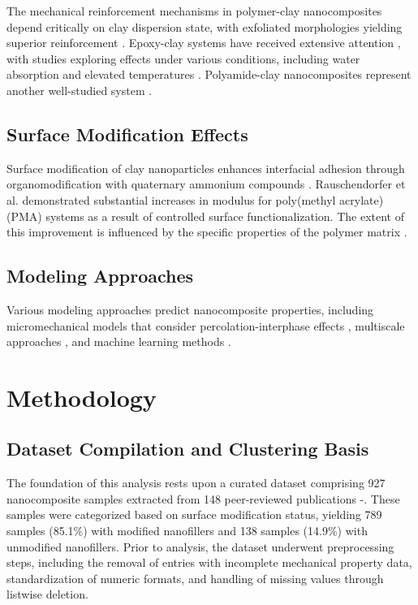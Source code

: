 \documentclass[conference]{IEEEtran}
\begin{document}
The mechanical reinforcement mechanisms in polymer-clay nanocomposites depend critically on clay dispersion state, with exfoliated morphologies yielding superior reinforcement \cite{10, 25}. Epoxy-clay systems have received extensive attention \cite{15, 24, 55, 59, 92}, with studies exploring effects under various conditions, including water absorption \cite{26, 39, 65} and elevated temperatures \cite{70}. Polyamide-clay nanocomposites represent another well-studied system \cite{64, 80, 88, 107, 117, 129, 133}.

\subsection{Surface Modification Effects}

Surface modification of clay nanoparticles enhances interfacial adhesion through organomodification with quaternary ammonium compounds \cite{134, 138}. Rauschendorfer et al. \cite{1} demonstrated substantial increases in modulus for poly(methyl acrylate) (PMA) systems as a result of controlled surface functionalization. The extent of this improvement is influenced by the specific properties of the polymer matrix \cite{69, 90, 107}.

\subsection{Modeling Approaches}

Various modeling approaches predict nanocomposite properties, including micromechanical models that consider percolation-interphase effects \cite{8, 9, 11, 12, 13, 17}, multiscale approaches \cite{22}, and machine learning methods \cite{79, 116}.

\section{Methodology}

\subsection{Dataset Compilation and Clustering Basis}

The foundation of this analysis rests upon a curated dataset comprising 927 nanocomposite samples extracted from 148 peer-reviewed publications \cite{1}-\cite{148}. These samples were categorized based on surface modification status, yielding 789 samples (85.1\%) with modified nanofillers and 138 samples (14.9\%) with unmodified nanofillers. Prior to analysis, the dataset underwent preprocessing steps, including the removal of entries with incomplete mechanical property data, standardization of numeric formats, and handling of missing values through listwise deletion.
\end{document}
